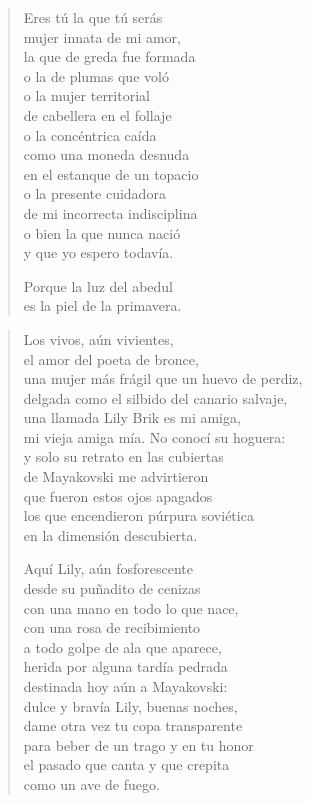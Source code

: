 \documentclass[12pt]{article}
\begin{document}
\begin{verse}
Eres tú la que tú serás\\
mujer innata de mi amor,\\
la que de greda fue formada\\
o la de plumas que voló\\
o la mujer territorial\\
de cabellera en el follaje\\
o la concéntrica caída\\
como una moneda desnuda\\
en el estanque de un topacio\\
o la presente cuidadora\\
de mi incorrecta indisciplina\\
o bien la que nunca nació\\
y que yo espero todavía.  

Porque la luz del abedul\\
es la piel de la primavera.  

\end{verse}

\clearpage
{}
\begin{verse}

Los vivos, aún vivientes,\\
el amor del poeta de bronce,\\
una mujer más frágil que un huevo de perdiz,\\
delgada como el silbido del canario salvaje,\\
una llamada Lily Brik es mi amiga,\\
mi vieja amiga mía. No conocí su hoguera:\\
y solo su retrato en las cubiertas\\
de Mayakovski me advirtieron\\
que fueron estos ojos apagados\\
los que encendieron púrpura soviética\\
en la dimensión descubierta.  

Aquí Lily, aún fosforescente\\
desde su puñadito de cenizas\\
con una mano en todo lo que nace,\\
con una rosa de recibimiento\\
a todo golpe de ala que aparece,\\
herida por alguna tardía pedrada\\
destinada hoy aún a Mayakovski:\\
dulce y bravía Lily, buenas noches,\\
dame otra vez tu copa transparente\\
para beber de un trago y en tu honor\\
el pasado que canta y que crepita\\
como un ave de fuego.  

\end{verse}
\end{document}
